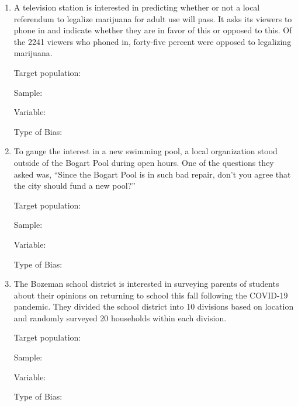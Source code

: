 \documentclass[
]{report}
\begin{document}
\newpage

\begin{enumerate}
\def\labelenumi{\arabic{enumi}.}
\setcounter{enumi}{2}
\item
  A television station is interested in predicting whether or not a local referendum to legalize marijuana for adult use will pass. It asks its viewers to phone in and indicate whether they are in favor of this or opposed to this. Of the 2241 viewers who phoned in, forty-five percent were opposed to legalizing marijuana.
  \vspace{0.1in}

  Target population:
  \vspace{0.3in}

  Sample:
  \vspace{0.3in}

  Variable:
  \vspace{0.3in}

  Type of Bias:
  \vspace{0.3in}
\item
  To gauge the interest in a new swimming pool, a local organization stood outside of the Bogart Pool during open hours. One of the questions they asked was, ``Since the Bogart Pool is in such bad repair, don't you agree that the city should fund a new pool?''\\
  \vspace{0.1in}

  Target population:
  \vspace{0.3in}

  Sample:
  \vspace{0.3in}

  Variable:
  \vspace{0.3in}

  Type of Bias:
  \vspace{0.3in}
\item
  The Bozeman school district is interested in surveying parents of students about their opinions on returning to school this fall following the COVID-19 pandemic. They divided the school district into 10 divisions based on location and randomly surveyed 20 households within each division.
  \vspace{0.1in}

  Target population:
  \vspace{0.3in}

  Sample:
  \vspace{0.3in}

  Variable:
  \vspace{0.3in}

  Type of Bias:
  \vspace{0.3in}
\end{enumerate}
\end{document}
